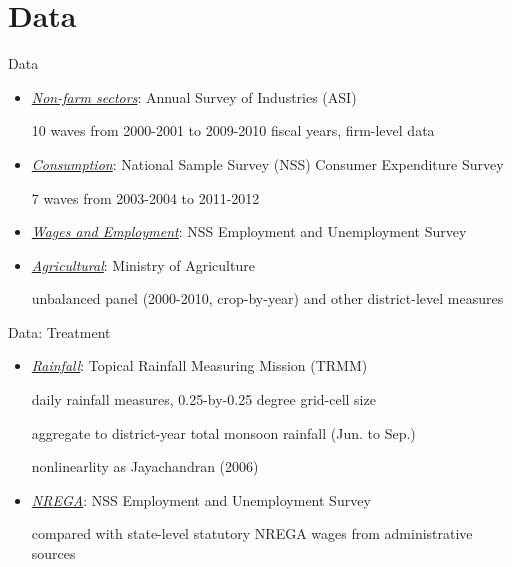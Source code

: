\section{Data}

 \frame{\sectionpage}

    \begin{frame}{Data}
        \begin{itemize}
            \item {\color{mygreen}\underline{\textit{Non-farm sectors}}}: Annual Survey of Industries (ASI)
            
            \hfill {\small 10 waves from 2000-2001 to 2009-2010 fiscal years, firm-level data} %
            \item {\color{mygreen}\underline{\textit{Consumption}}}: National Sample Survey (NSS) Consumer Expenditure Survey
            
            \hfill {\small 7 waves from 2003-2004 to 2011-2012}
            \item {\color{mygreen}\underline{\textit{Wages and Employment}}}: NSS Employment and Unemployment Survey
            \item {\color{mygreen}\underline{\textit{Agricultural}}}: Ministry of Agriculture
            
            \hfill {\small unbalanced panel (2000-2010, crop-by-year) and other district-level measures}
        \end{itemize}
    \end{frame}

    \begin{frame}{Data: Treatment}
        \begin{itemize}
            \item<1-> {\color{mygreen}\underline{\textit{Rainfall}}}: Topical Rainfall Measuring Mission (TRMM)
            
            \hfill {\small daily rainfall measures, 0.25-by-0.25 degree grid-cell size}
            
            \hfill {\small aggregate to district-year total monsoon rainfall (Jun. to Sep.)}

            \hfill {\small nonlinearlity as Jayachandran (2006)}
            \item<2-> {\color{mygreen}\underline{\textit{NREGA}}}: NSS Employment and Unemployment Survey
            
            \hfill {\small compared with state-level statutory NREGA wages from administrative sources}
        \end{itemize}
    
    \end{frame}

